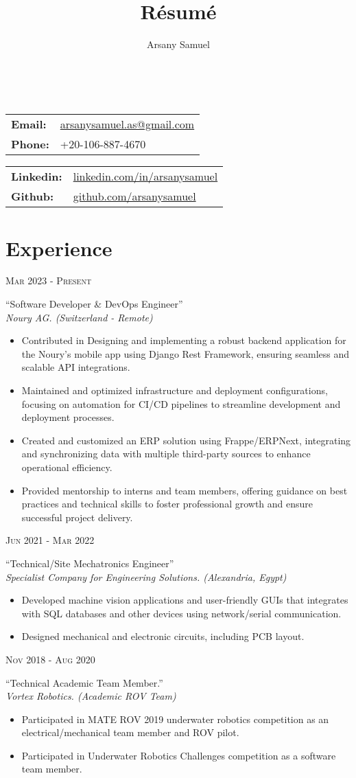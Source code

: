 \documentclass[a4paper]{article}
\title{R\'esum\'e}
\author{Arsany Samuel}
\makeatletter
\renewcommand{\maketitle}{
	\begin{center}
		{\Huge\bfseries{\theauthor}}\\
			\vspace{0.5em}
		{
			\begin{center}
                \begin{minipage}{0.4\linewidth}
                    \large\begin{tabular}{l  l}
                        \textbf{Email:} & \href{mailto:arsanysamuel.as@gmail.com}{arsanysamuel.as@gmail.com}  \\ 
                        \textbf{Phone:} & +20-106-887-4670  \\
                    \end{tabular}
                \end{minipage}
                \hspace{1em}
                \begin{minipage}{0.4\linewidth}
                    \large\begin{tabular}{l  l}
                        \textbf{Linkedin:} & \href{https://linkedin.com/in/arsanysamuel}{linkedin.com/in/arsanysamuel}  \\
                        \textbf{Github:} & \href{https://github.com/arsanysamuel}{github.com/arsanysamuel}
                    \end{tabular}
                \end{minipage}
			\end{center}
		}
	\end{center}
}
\newcommand{\entry}[4]{   %
	\begin{center}
		\begin{minipage}[c]{0.2\linewidth}  %
			\vfill
			\hfill  %
			\textsc{#1}  %
			\vfill
		\end{minipage}
		\hfill\vline\hfill  %
		\begin{minipage}[c]{0.75\linewidth}
			\textrm{``#2''} \\
			\textit{#3} \\
			\footnotesize{#4}
		\end{minipage}
	\end{center}
}
\newcommand{\blist}[1]{  %
    \vspace{-\topsep}
    \renewcommand\labelitemi{\tiny$\bullet$}
    \begin{itemize}[leftmargin=3.5mm, noitemsep]
        #1
    \end{itemize}
}
\makeatother
\begin{document}
	\maketitle


	\section{Experience}
        \entry{Mar 2023 - Present}
            {Software Developer \& DevOps Engineer}
            {Noury AG. (Switzerland - Remote)}
            {
                \blist{
                    \item Contributed in Designing and implementing a robust backend application for the Noury’s mobile app using Django Rest Framework, ensuring seamless and scalable API integrations.
                    \item Maintained and optimized infrastructure and deployment configurations, focusing on automation for CI/CD pipelines to streamline development and deployment processes.
                    \item Created and customized an ERP solution using Frappe/ERPNext, integrating and synchronizing data with multiple third-party sources to enhance operational efficiency.
                    \item Provided mentorship to interns and team members, offering guidance on best practices and technical skills to foster professional growth and ensure successful project delivery.
                }
            }
        \entry{Jun 2021 - Mar 2022}
            {Technical/Site Mechatronics Engineer}
            {Specialist Company for Engineering Solutions. (Alexandria, Egypt)}
            {
                \blist{
                    \item Developed machine vision applications and user-friendly GUIs 
                    that integrates with SQL databases and other devices using network/serial communication.
                    \item Designed mechanical and electronic circuits, including PCB layout.
                }
            }
		\entry{Nov 2018 - Aug 2020}
			{Technical Academic Team Member.}
			{Vortex Robotics. (Academic ROV Team)}
            {
                \blist{
                    \item Participated in MATE ROV 2019 underwater robotics competition as an electrical/mechanical team member and ROV pilot.
                    \item Participated in Underwater Robotics Challenges competition as a software team member.
                }
            }
\end{document}
